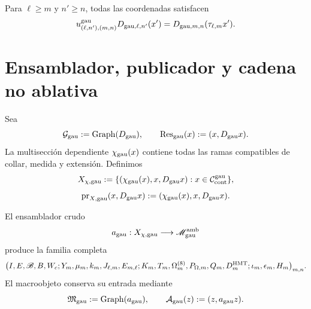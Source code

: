 Para \(\ell\ge m\) y \(n'\ge n\), todas las coordenadas satisfacen
\begin{equation}\label{eq:gauint-naturalidad-trece}
 u^{\rm gau}_{(\ell,n'),(m,n)}D_{{\rm gau},\ell,n'}(x')
 =D_{{\rm gau},m,n}(\tau_{\ell,m}x').
\end{equation}

\section{Ensamblador, publicador y cadena no ablativa}

Sea
\begin{equation}\label{eq:gauint-graph-d}
 \mathcal G_{\rm gau}:=\operatorname{Graph}(D_{\rm gau}),
 \qquad
 \operatorname{Res}_{\rm gau}(x):=(x,D_{\rm gau}x).
\end{equation}
La multisección dependiente \(\chi_{\rm gau}(x)\) contiene todas las ramas
compatibles de collar, medida y extensión. Definimos
\begin{equation}\label{eq:gauint-x-dependiente}
 X_{\chi,{\rm gau}}
 :=\{(\chi_{\rm gau}(x),x,D_{\rm gau}x):
 x\in\mathcal C_{\rm cont}^{\rm gau}\},
\end{equation}
\begin{equation}\label{eq:gauint-prx}
 \operatorname{pr}_{X,{\rm gau}}(x,D_{\rm gau}x)
 :=(\chi_{\rm gau}(x),x,D_{\rm gau}x).
\end{equation}

El ensamblador crudo
\begin{equation}\label{eq:gauint-ensamblador-crudo}
 a_{\rm gau}:X_{\chi,{\rm gau}}\longrightarrow
 \mathscr M_{\rm gau}^{\rm amb}
\end{equation}
produce la familia completa
\[
 \bigl(I,E,\mathscr B,B,W_c;
 Y_m,\mu_m,k_m,J_{\ell,m},E_{m,\ell};
 K_m,T_m,\Omega_m^{(8)},P_{\Omega,m},Q_m,D_m^{\rm HMT};
 \iota_m,\epsilon_m,H_m\bigr)_{m,n}.
\]
El macroobjeto conserva su entrada mediante
\begin{equation}\label{eq:gauint-graph-a}
 \mathfrak M_{\rm gau}:=\operatorname{Graph}(a_{\rm gau}),
 \qquad
 \mathcal A_{\rm gau}(z):=(z,a_{\rm gau}z).
\end{equation}

